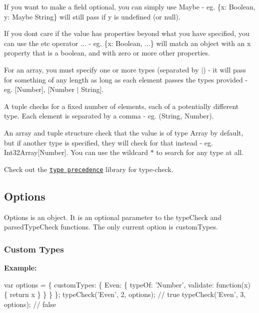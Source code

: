 If you want to make a field optional, you can simply use {\ttfamily Maybe} -\/ eg. {\ttfamily \{x\+: Boolean, y\+: Maybe String\}} will still pass if {\ttfamily y} is undefined (or null).

If you don\textquotesingle{}t care if the value has properties beyond what you have specified, you can use the \textquotesingle{}etc\textquotesingle{} operator {\ttfamily ...} -\/ eg. {\ttfamily \{x\+: Boolean, ...\}} will match an object with an {\ttfamily x} property that is a boolean, and with zero or more other properties.

For an array, you must specify one or more types (separated by {\ttfamily $\vert$}) -\/ it will pass for something of any length as long as each element passes the types provided -\/ eg. {\ttfamily \mbox{[}Number\mbox{]}}, {\ttfamily \mbox{[}Number $\vert$ String\mbox{]}}.

A tuple checks for a fixed number of elements, each of a potentially different type. Each element is separated by a comma -\/ eg. {\ttfamily (String, Number)}.

An array and tuple structure check that the value is of type {\ttfamily Array} by default, but if another type is specified, they will check for that instead -\/ eg. {\ttfamily Int32\+Array\mbox{[}Number\mbox{]}}. You can use the wildcard {\ttfamily $\ast$} to search for any type at all.

Check out the \href{https://github.com/zaboco/type-precedence}{\tt type precedence} library for type-\/check.

\subsection*{Options}

Options is an object. It is an optional parameter to the {\ttfamily type\+Check} and {\ttfamily parsed\+Type\+Check} functions. The only current option is {\ttfamily custom\+Types}.

\label{_custom-types}%
 \subsubsection*{Custom Types}

{\bfseries Example\+:}


\begin{DoxyCode}
var options = \{
  customTypes: \{
    Even: \{
      typeOf: 'Number',
      validate: function(x) \{
        return x %
      \}
    \}
  \}
\};
typeCheck('Even', 2, options); // true
typeCheck('Even', 3, options); // false
\end{DoxyCode}


